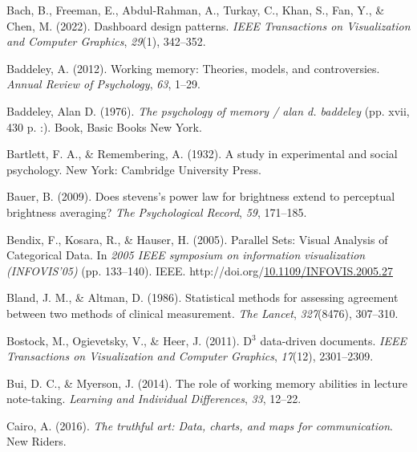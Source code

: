 \documentclass[print]{nuthesis}
\newlength{\cslhangindent}
\newenvironment{CSLReferences}[2]%
{\setlength{\parindent}{0pt}%
\everypar{\setlength{\hangindent}{\cslhangindent}}\ignorespaces}%
{\par}
\begin{document}
\begin{CSLReferences}{1}{0}
\leavevmode{}%
Bach, B., Freeman, E., Abdul-Rahman, A., Turkay, C., Khan, S., Fan, Y., \& Chen, M. (2022). Dashboard design patterns. \emph{IEEE Transactions on Visualization and Computer Graphics}, \emph{29}(1), 342--352.

\leavevmode{}%
Baddeley, A. (2012). Working memory: Theories, models, and controversies. \emph{Annual Review of Psychology}, \emph{63}, 1--29.

\leavevmode{}%
Baddeley, Alan D. (1976). \emph{The psychology of memory / alan d. baddeley} (pp. xvii, 430 p. :). Book, Basic Books New York.

\leavevmode{}%
Bartlett, F. A., \& Remembering, A. (1932). A study in experimental and social psychology. New York: Cambridge University Press.

\leavevmode{}%
Bauer, B. (2009). Does stevens's power law for brightness extend to perceptual brightness averaging? \emph{The Psychological Record}, \emph{59}, 171--185.

\leavevmode{}%
Bendix, F., Kosara, R., \& Hauser, H. (2005). {Parallel Sets: Visual Analysis of Categorical Data}. In \emph{2005 IEEE symposium on information visualization (INFOVIS'05)} (pp. 133--140). IEEE. http://doi.org/\href{https://doi.org/10.1109/INFOVIS.2005.27}{10.1109/INFOVIS.2005.27}

\leavevmode{}%
Bland, J. M., \& Altman, D. (1986). Statistical methods for assessing agreement between two methods of clinical measurement. \emph{The Lancet}, \emph{327}(8476), 307--310.

\leavevmode{}%
Bostock, M., Ogievetsky, V., \& Heer, J. (2011). D\(^3\) data-driven documents. \emph{IEEE Transactions on Visualization and Computer Graphics}, \emph{17}(12), 2301--2309.

\leavevmode{}%
Bui, D. C., \& Myerson, J. (2014). The role of working memory abilities in lecture note-taking. \emph{Learning and Individual Differences}, \emph{33}, 12--22.

\leavevmode{}%
Cairo, A. (2016). \emph{The truthful art: Data, charts, and maps for communication}. New Riders.


\end{CSLReferences}
\end{document}
